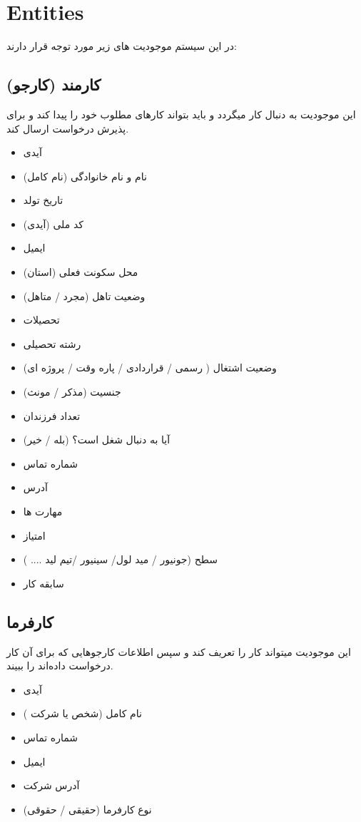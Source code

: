 \documentclass{article}
\begin{document}
	
	\section{Entities}
	در این سیستم موجودیت های زیر مورد توجه قرار دارند:
		\subsection{کارمند (کارجو)}
 این موجودیت به دنبال کار میگردد و باید بتواند کارهای مطلوب خود را پیدا کند و برای پذیرش درخواست ارسال کند.
 \begin{itemize}
 \item آیدی
\item نام و نام خانوادگی (نام کامل)
\item تاریخ تولد
\item کد ملی (آیدی)
\item ایمیل
\item محل سکونت فعلی (استان)
\item وضعیت تاهل (مجرد / متاهل)
\item تحصیلات
\item رشته تحصیلی
\item وضعیت اشتغال ( رسمی / قراردادی / پاره وقت / پروژه ای)
\item جنسیت (مذکر / مونث)
\item تعداد فرزندان
\item آیا به دنبال شغل است؟ (بله / خیر)
\item شماره تماس
\item آدرس
\item مهارت ها
\item امتیاز
\item سطح (جونیور / مید لول/ سینیور /تیم لید .... )
\item سابقه کار

 \end{itemize}
 
		\subsection{کارفرما}
		این موجودیت میتواند کار را تعریف کند و سپس اطلاعات کارجوهایی که برای آن کار درخواست داده‌اند را ببیند.
\begin{itemize}


\item آیدی
\item نام کامل (شخص یا شرکت )
\item شماره تماس
\item ایمیل
\item آدرس شرکت
\item نوع کارفرما (حقیقی / حقوقی)
\end{itemize}
\end{document}
